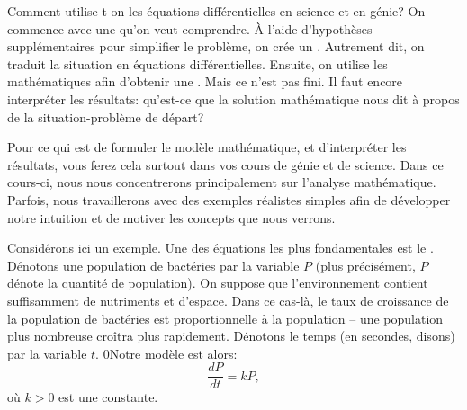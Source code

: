 Comment utilise-t-on les équations différentielles en science et en génie?  
On commence avec une \emph{} qu'on veut comprendre.  
À l'aide d'hypothèses supplémentaires pour simplifier le problème, on crée un \emph{}. 
Autrement dit, on traduit la situation en équations différentielles.  
Ensuite, on utilise les mathématiques afin d'obtenir une \emph{}.  
Mais ce n'est pas fini.  Il faut encore interpréter les résultats: qu'est-ce que la solution mathématique 
nous dit à propos de la situation-problème de départ?

Pour ce qui est de formuler le modèle mathématique, et d'interpréter les résultats, vous ferez cela surtout dans vos cours de génie et de science.  
Dans ce cours-ci, nous nous concentrerons principalement sur l'analyse mathématique.  
Parfois, nous travaillerons avec des exemples réalistes simples afin de développer notre intuition et de motiver les concepts que nous verrons.

Considérons ici un exemple.  Une des équations les plus fondamentales est le \emph{}.  
Dénotons une population de bactéries par la variable $P$ (plus précisément, $P$ dénote la quantité de population).  
On suppose que l'environnement contient suffisamment de nutriments et d'espace.  
Dans ce cas-là, le taux de croissance de la population de bactéries est proportionnelle à la population -- 
une population plus nombreuse croîtra plus rapidement.  
Dénotons le temps (en secondes, disons) par la variable $t$.  
0Notre modèle est alors: 
\begin{equation*}
	\frac{dP}{dt} = kP, 
\end{equation*}
où $k > 0$ est une constante.

